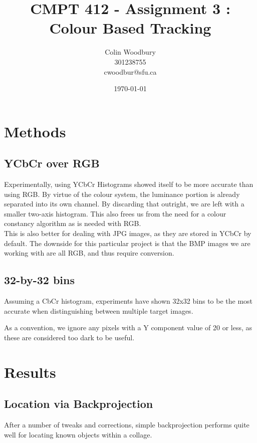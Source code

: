 \documentclass{article}
\begin{document}
\title{CMPT 412 - Assignment 3 : Colour Based Tracking}
\author{Colin Woodbury\\ 301238755\\ cwoodbur@sfu.ca}
\date{\today}
\maketitle

\tableofcontents
\clearpage

\section{Methods}
\subsection{YCbCr over RGB}
Experimentally, using YCbCr Histograms showed itself to be more accurate
than using RGB. By virtue of the colour system, the luminance portion is
already separated into its own channel. By discarding that outright,
we are left with a smaller two-axis histogram. This also frees us from
the need for a colour constancy algorithm as is needed with RGB.\\

This is also better for dealing with JPG images, as they are stored in
YCbCr by default. The downside for this particular project is that
the BMP images we are working with are all RGB, and thus require conversion.

\subsection{32-by-32 bins}
Assuming a CbCr histogram, experiments have shown 32x32 bins to be
the most accurate when distinguishing between multiple target images.

As a convention, we ignore any pixels with a Y component value of 20
or less, as these are considered too dark to be useful.

\section{Results}

\subsection{Location via Backprojection}
After a number of tweaks and corrections, simple backprojection performs
quite well for locating known objects within a collage.
\end{document}
